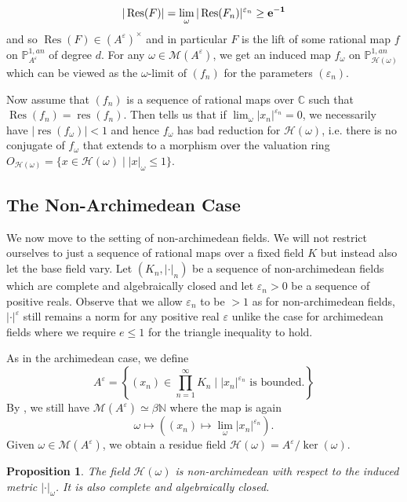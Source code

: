 \documentclass[10pt]{amsart}
\newcommand{\bb}{\mathbb}
\newcommand{\Res}{\operatorname{Res}}
\newcommand{\res}{\operatorname{res}}
\newcommand{\berkP}{\mathbb{P}^{1,an}}
\newcommand{\cal}{\mathcal}
\newcommand{\eps}{\varepsilon}
\numberwithin{theorem}{section}
\newtheorem{proposition}[theorem]{Proposition}
\numberwithin{example}{section}
\numberwithin{definition}{section}
\begin{document}
$$|\Res(F)| = \lim_{\omega} |\Res(F_n)|^{\eps_n} \geq \bf{e}^{-1}$$
and so $\Res(F) \in (A^{\eps})^{\times}$ and in particular $F$ is the lift of some rational map $f$ on $\berkP_{A^{\eps}}$ of degree $d$. For any $\omega \in \cal{M}(A^{\eps})$, we get an induced map $f_{\omega}$ on $\berkP_{\cal{H}(\omega)}$ which can be viewed as the $\omega$-limit of $(f_n)$ for the parameters $(\eps_n)$. 
\par 
Now assume that $(f_n)$ is a sequence of rational maps over $\bb{C}$ such that $\Res(f_n) = \res(f_n)$. Then \cite[Theorem 3.17]{FG24} tells us that if $\lim_{\omega} |x_n|^{\eps_n} = 0$, we necessarily have $|\res(f_{\omega})| < 1$ and hence $f_{\omega}$ has bad reduction for $\cal{H}(\omega)$, i.e. there is no conjugate of $f_{\omega}$ that extends to a morphism over the valuation ring $O_{\cal{H}(\omega)} = \{x \in \cal{H}(\omega) \mid |x|_{\omega} \leq 1\}.$ 

\subsection{The Non-Archimedean Case} \label{sec: NonArchimedean}
We now move to the setting of non-archimedean fields. We will not restrict ourselves to just a sequence of rational maps over a fixed field $K$ but instead also let the base field vary. Let $(K_n, | \cdot |_n)$ be a sequence of non-archimedean fields which are complete and algebraically closed and let $\eps_n > 0$ be a sequence of positive reals. Observe that we allow $\eps_n$ to be $> 1$ as for non-archimedean fields, $| \cdot |^{\eps}$ still remains a norm for any positive real $\eps$ unlike the case for archimedean fields where we require $e \leq 1$ for the triangle inequality to hold. 
\par 
As in the archimedean case, we define 
$$A^{\eps} = \left\{ (x_n) \in \prod_{n=1}^{\infty} K_n \mid |x_n|^{\eps_n} \text{ is bounded.} \right\}$$
By \cite[Proposition 1.2.3]{Ber90}, we still have $\cal{M}(A^{\eps}) \simeq \beta \bb{N}$ where the map is again
$$\omega \mapsto \left((x_n) \mapsto \lim_{\omega} |x_n|^{\eps_n} \right).$$
Given $\omega \in \cal{M}(A^{\eps})$, we obtain a residue field $\cal{H}(\omega) = A^{\eps}/\ker(\omega)$. 

\begin{proposition} \label{NonArchDegen1}
The field $\cal{H}(\omega)$ is non-archimedean with respect to the induced metric $| \cdot |_{\omega}$. It is also complete and algebraically closed.
\end{proposition}
\end{document}
